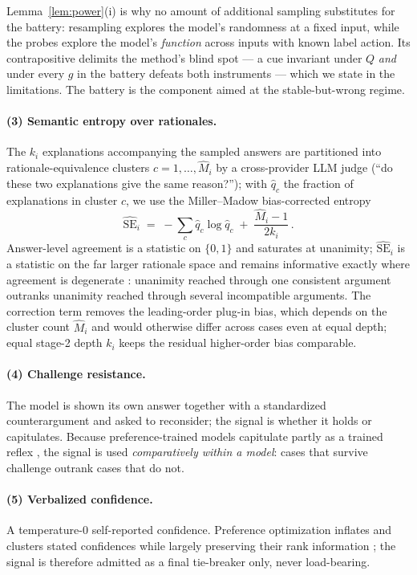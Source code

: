 \documentclass[11pt]{article}
\newcommand{\SE}{\mathrm{SE}}
\begin{document}
Lemma~\ref{lem:power}(i) is why no amount of additional sampling
substitutes for the battery: resampling explores the model's randomness
at a fixed input, while the probes explore the model's \emph{function}
across inputs with known label action. Its contrapositive delimits the
method's blind spot --- a cue invariant under $Q$ \emph{and} under
every $g$ in the battery defeats both instruments --- which we state in
the limitations. The battery is the component aimed at the
stable-but-wrong regime.

\paragraph{(3) Semantic entropy over rationales.}
The $k_i$ explanations accompanying the sampled answers are partitioned
into rationale-equivalence clusters $c = 1, \dots, \hat M_i$ by a
cross-provider LLM judge (``do these two explanations give the same
reason?''); with $\hat q_c$ the fraction of explanations in cluster
$c$, we use the Miller--Madow bias-corrected entropy
\citep{miller1955}
\begin{equation}
  \widehat{\SE}_i \;=\; -\sum_{c} \hat q_c \log \hat q_c
  \;+\; \frac{\hat M_i - 1}{2 k_i}\, .
  \label{eq:se}
\end{equation}
Answer-level agreement is a statistic on $\{0,1\}$ and saturates at
unanimity; $\widehat{\SE}_i$ is a statistic on the far larger rationale
space and remains informative exactly where agreement is degenerate
\citep{kuhn2023,farquhar2024}: unanimity reached through one consistent
argument outranks unanimity reached through several incompatible
arguments. The correction term removes the leading-order plug-in bias,
which depends on the cluster count $\hat M_i$ and would otherwise
differ across cases even at equal depth; equal stage-2 depth $k_i$
keeps the residual higher-order bias comparable.

\paragraph{(4) Challenge resistance.}
The model is shown its own answer together with a standardized
counterargument and asked to reconsider; the signal is whether it holds
or capitulates. Because preference-trained models capitulate partly as
a trained reflex \citep{sharma2023}, the signal is used
\emph{comparatively within a model}: cases that survive challenge
outrank cases that do not.

\paragraph{(5) Verbalized confidence.}
A temperature-$0$ self-reported confidence. Preference optimization
inflates and clusters stated confidences while largely preserving their
rank information \citep{tian2023,xiong2023}; the signal is therefore
admitted as a final tie-breaker only, never load-bearing.
\end{document}
